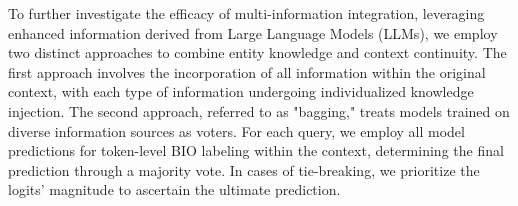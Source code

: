To further investigate the efficacy of multi-information integration, leveraging enhanced information derived from Large Language Models (LLMs), we employ two distinct approaches to combine entity knowledge and context continuity. The first approach involves the incorporation of all information within the original context, with each type of information undergoing individualized knowledge injection. The second approach, referred to as "bagging," treats models trained on diverse information sources as voters. For each query, we employ all model predictions for token-level BIO labeling within the context, determining the final prediction through a majority vote. In cases of tie-breaking, we prioritize the logits' magnitude to ascertain the ultimate prediction.

